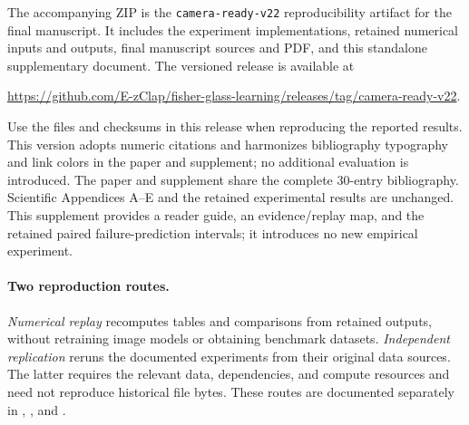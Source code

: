 The accompanying ZIP is the \texttt{camera-ready-v22} reproducibility artifact
for the final manuscript. It includes the experiment implementations, retained
numerical inputs and outputs, final manuscript sources and PDF, and this
standalone supplementary document. The versioned release is available at
\begin{center}
\url{https://github.com/E-zClap/fisher-glass-learning/releases/tag/camera-ready-v22}.
\end{center}
Use the files and checksums in this release when reproducing the reported
results. This version adopts numeric citations and harmonizes bibliography typography
and link colors in the paper and supplement; no additional evaluation is introduced. The paper and
supplement share the complete 30-entry bibliography. Scientific Appendices
A--E and the retained experimental results are unchanged. This supplement
provides a reader guide, an evidence/replay map, and the retained paired
failure-prediction intervals; it introduces no new empirical experiment.

\paragraph{Two reproduction routes.}
\emph{Numerical replay} recomputes tables and comparisons from retained outputs, without retraining image models or obtaining benchmark datasets. \emph{Independent replication} reruns the documented experiments from their original data sources. The latter requires the relevant data, dependencies, and compute resources and need not reproduce historical file bytes. These routes are documented separately in , , and .

